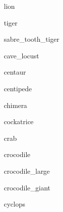 \documentclass[letterpaper,serif]{module}
\begin{document}
\begin{newmonster}{lion}\end{newmonster}

\begin{newmonster}{tiger}\end{newmonster}

\begin{newmonster}{sabre_tooth_tiger}\end{newmonster}

\begin{newmonster}{cave_locust}\end{newmonster}

\begin{newmonster}{centaur}\end{newmonster}

\begin{newmonster}{centipede}\end{newmonster}

\begin{newmonster}{chimera}\end{newmonster}

\begin{newmonster}{cockatrice}\end{newmonster}

\begin{newmonster}{crab}\end{newmonster}


\begin{newmonster}{crocodile}\end{newmonster}

\begin{newmonster}{crocodile_large}\end{newmonster}

\begin{newmonster}{crocodile_giant}\end{newmonster}

\begin{newmonster}{cyclops}\end{newmonster}
\end{document}
